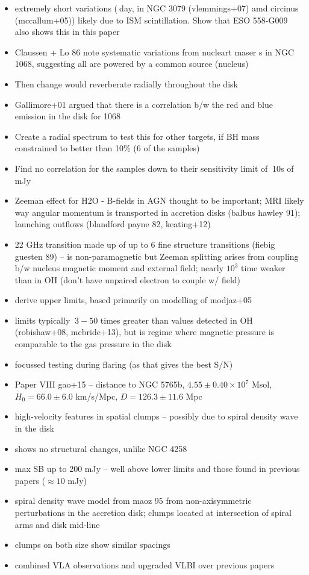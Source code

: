 \begin{itemize}
\item extremely short variations ($~$day, in NGC 3079 (vlemmings+07) amd circinus (mccallum+05)) likely due to ISM scintillation. Show that ESO 558-G009 also shows this in this paper
\item Claussen + Lo 86 note systematic variations from nucleart maser s in NGC 1068, suggesting all are powered by a common source (nucleus)
\item Then change would reverberate radially throughout the disk
\item Gallimore+01 argued that there is a correlation b/w the red and blue emission in the disk for 1068
\item Create a radial spectrum to test this for other targets, if BH mass constrained to better than 10\% (6 of the samples)
\item Find no correlation for the samples down to their sensitivity limit of $~$10s of mJy
\item Zeeman effect for H2O - B-fields in AGN thought to be important; MRI likely way angular momentum is transported in accretion disks (balbus hawley 91); launching outflows (blandford payne 82, keating+12)
\item 22 GHz transition made up of up to 6 fine structure transitions (fiebig guesten 89) -- is non-paramagnetic but Zeeman splitting arises from coupling b/w nucleus magnetic moment and external field; nearly $10^3$ time weaker than in OH (don't have unpaired electron to couple w/ field)
\item derive upper limits, based primarily on modelling of modjaz+05
\item limits typically $~3-50$ times greater than values detected in OH (robishaw+08, mcbride+13), but is regime where magnetic pressure is comparable to the gas pressure in the disk
\item focussed testing during flaring (as that gives the best S/N)
\item Paper VIII gao+15 -- distance to NGC 5765b, $4.55\pm0.40\times10^7$ Msol, $H_0=66.0\pm6.0$ km/s/Mpc, $D=126.3\pm11.6$ Mpc
\item high-velocity features in spatial clumps -- possibly due to spiral density wave in the disk
\item shows no structural changes, unlike NGC 4258
\item max SB up to 200 mJy -- well above lower limits and those found in previous papers ($\approx 10$ mJy)
\item spiral density wave model from maoz 95 from non-axisymmetric perturbations in the accretion disk; clumps located at intersection of spiral arms and disk mid-line
\item clumps on both size show similar spacings
\item combined VLA observations and upgraded VLBI over previous papers
\end{itemize}


